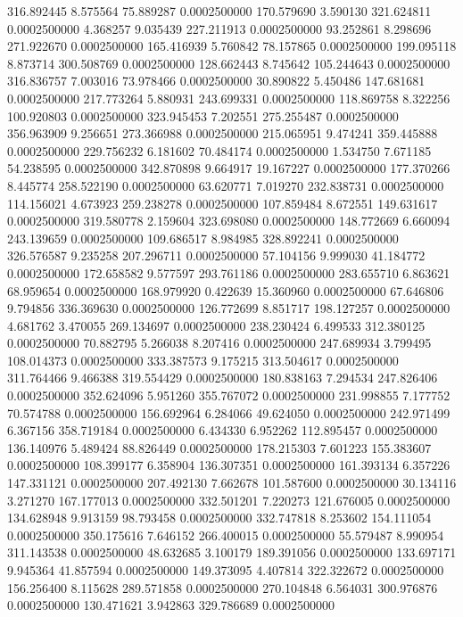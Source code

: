 316.892445 8.575564 75.889287 0.0002500000
170.579690 3.590130 321.624811 0.0002500000
4.368257 9.035439 227.211913 0.0002500000
93.252861 8.298696 271.922670 0.0002500000
165.416939 5.760842 78.157865 0.0002500000
199.095118 8.873714 300.508769 0.0002500000
128.662443 8.745642 105.244643 0.0002500000
316.836757 7.003016 73.978466 0.0002500000
30.890822 5.450486 147.681681 0.0002500000
217.773264 5.880931 243.699331 0.0002500000
118.869758 8.322256 100.920803 0.0002500000
323.945453 7.202551 275.255487 0.0002500000
356.963909 9.256651 273.366988 0.0002500000
215.065951 9.474241 359.445888 0.0002500000
229.756232 6.181602 70.484174 0.0002500000
1.534750 7.671185 54.238595 0.0002500000
342.870898 9.664917 19.167227 0.0002500000
177.370266 8.445774 258.522190 0.0002500000
63.620771 7.019270 232.838731 0.0002500000
114.156021 4.673923 259.238278 0.0002500000
107.859484 8.672551 149.631617 0.0002500000
319.580778 2.159604 323.698080 0.0002500000
148.772669 6.660094 243.139659 0.0002500000
109.686517 8.984985 328.892241 0.0002500000
326.576587 9.235258 207.296711 0.0002500000
57.104156 9.999030 41.184772 0.0002500000
172.658582 9.577597 293.761186 0.0002500000
283.655710 6.863621 68.959654 0.0002500000
168.979920 0.422639 15.360960 0.0002500000
67.646806 9.794856 336.369630 0.0002500000
126.772699 8.851717 198.127257 0.0002500000
4.681762 3.470055 269.134697 0.0002500000
238.230424 6.499533 312.380125 0.0002500000
70.882795 5.266038 8.207416 0.0002500000
247.689934 3.799495 108.014373 0.0002500000
333.387573 9.175215 313.504617 0.0002500000
311.764466 9.466388 319.554429 0.0002500000
180.838163 7.294534 247.826406 0.0002500000
352.624096 5.951260 355.767072 0.0002500000
231.998855 7.177752 70.574788 0.0002500000
156.692964 6.284066 49.624050 0.0002500000
242.971499 6.367156 358.719184 0.0002500000
6.434330 6.952262 112.895457 0.0002500000
136.140976 5.489424 88.826449 0.0002500000
178.215303 7.601223 155.383607 0.0002500000
108.399177 6.358904 136.307351 0.0002500000
161.393134 6.357226 147.331121 0.0002500000
207.492130 7.662678 101.587600 0.0002500000
30.134116 3.271270 167.177013 0.0002500000
332.501201 7.220273 121.676005 0.0002500000
134.628948 9.913159 98.793458 0.0002500000
332.747818 8.253602 154.111054 0.0002500000
350.175616 7.646152 266.400015 0.0002500000
55.579487 8.990954 311.143538 0.0002500000
48.632685 3.100179 189.391056 0.0002500000
133.697171 9.945364 41.857594 0.0002500000
149.373095 4.407814 322.322672 0.0002500000
156.256400 8.115628 289.571858 0.0002500000
270.104848 6.564031 300.976876 0.0002500000
130.471621 3.942863 329.786689 0.0002500000
